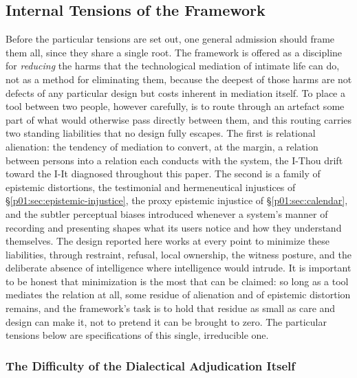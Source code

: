 \subsection{Internal Tensions of the Framework}

Before the particular tensions are set out, one general admission should frame them all, since they share a single root. The framework is offered as a discipline for \emph{reducing} the harms that the technological mediation of intimate life can do, not as a method for eliminating them, because the deepest of those harms are not defects of any particular design but costs inherent in mediation itself. To place a tool between two people, however carefully, is to route through an artefact some part of what would otherwise pass directly between them, and this routing carries two standing liabilities that no design fully escapes. The first is relational alienation: the tendency of mediation to convert, at the margin, a relation between persons into a relation each conducts with the system, the I-Thou drift toward the I-It diagnosed throughout this paper. The second is a family of epistemic distortions, the testimonial and hermeneutical injustices of §\ref{p01:sec:epistemic-injustice}, the proxy epistemic injustice of §\ref{p01:sec:calendar}, and the subtler perceptual biases introduced whenever a system's manner of recording and presenting shapes what its users notice and how they understand themselves. The design reported here works at every point to minimize these liabilities, through restraint, refusal, local ownership, the witness posture, and the deliberate absence of intelligence where intelligence would intrude. It is important to be honest that minimization is the most that can be claimed: so long as a tool mediates the relation at all, some residue of alienation and of epistemic distortion remains, and the framework's task is to hold that residue as small as care and design can make it, not to pretend it can be brought to zero. The particular tensions below are specifications of this single, irreducible one.

\subsubsection{The Difficulty of the Dialectical Adjudication Itself}

